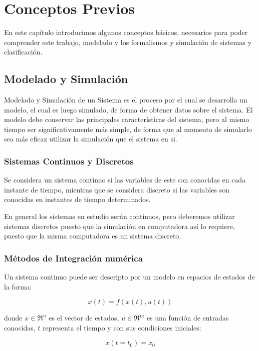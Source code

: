 \documentclass[a4paper,	11pt]{report}
\begin{document}
	
\chapter{Conceptos Previos}
En este capítulo introducimos algunos conceptos básicos, necesarios para poder comprender este trabajo, modelado y los formalismos y simulación de sistemas y clasificación.

\section{Modelado y Simulación}
Modelado y Simulación de un Sistema es el proceso por el cual se desarrolla un modelo, el cual es luego simulado, de forma de obtener datos sobre el sistema. El modelo debe conservar las principales características del sistema, pero al mismo tiempo ser significativamente más simple, de forma que al momento de simularlo sea más eficaz utilizar la simulación que el sistema en si.

\subsection{Sistemas Continuos y Discretos}
Se considera un sistema continuo si las variables de este son conocidas en cada instante de tiempo, mientras que se considera discreto si las variables son conocidas en instantes de tiempo determinados.

En general los sistemas en estudio serán continuos, pero deberemos utilizar sistemas discretos puesto que la simulación en computadora así lo requiere, puesto que la misma computadora es un sistema discreto.

\subsection{Métodos de Integración numérica}
Un sistema continuo puede ser descripto por un modelo en espacios de estados de la forma:

\begin{equation} \label{eq1}
x(t) = f (x(t), u(t))
\end{equation}

donde $x \in \Re^n$  es el vector de estados, $u \in \Re^m$ es una función de entradas conocidas,
$t$ representa el tiempo y con sus condiciones iniciales:

\begin{equation} \label{eq2}
x(t = t_0 ) = x_0
\end{equation}
\end{document}

